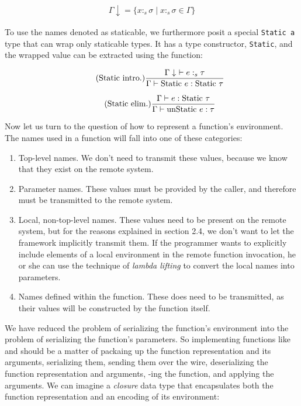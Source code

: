 \documentclass[preprint]{sigplanconf}
\begin{document}
\begin{align*}
\Gamma\downarrow = \{ x:_{s} \sigma \mid x :_{s} \sigma \in \Gamma \}
\end{align*}

To use the names denoted as staticable, we furthermore posit a special \lstinline!Static a! type that can wrap only staticable types. It has a type constructor, \lstinline!Static!, and the wrapped value can be extracted using the  function:

\begin{equation*}
\tag{Static~intro.}
\frac{\Gamma\downarrow~\vdash e :_{s} \tau}
     {\Gamma \vdash \text{Static}~e : \text{Static}~\tau}
\end{equation*}


\begin{equation*}
\tag{Static~elim.}
\frac{\Gamma \vdash e : \text{Static}~\tau}
     {\Gamma \vdash \text{unStatic}~e : \tau}
\end{equation*}

Now let us turn to the question of how to represent a function's environment. The names used in a function will fall into one of these categories:

\begin{enumerate}
\item Top-level names. We don't need to transmit these values, because we know that they exist on the remote system.
\item Parameter names. These values must be provided by the caller, and therefore must be transmitted to the remote system.
\item Local, non-top-level names. These values need to be present on the remote system, but for the reasons explained in section 2.4, we don't want to let the framework implicitly transmit them. If the programmer wants to explicitly include elements of a local environment in the remote function invocation, he or she can use the technique of {\em lambda lifting} \cite{lambdalifting} to convert the local names into parameters. %
\item Names defined within the function. These does need to be transmitted, as their values will be constructed by the function itself.
\end{enumerate}

We have reduced the problem of serializing the function's environment into the problem of serializing the function's parameters. So implementing functions like  and  should be a matter of packaing up the  function representation and its arguments, serializing them, sending them over the wire, deserializing the function representation and arguments, -ing the function, and applying the arguments. We can imagine a {\em closure} data type that encapsulates both the function representation and an encoding of its environment:
\end{document}
